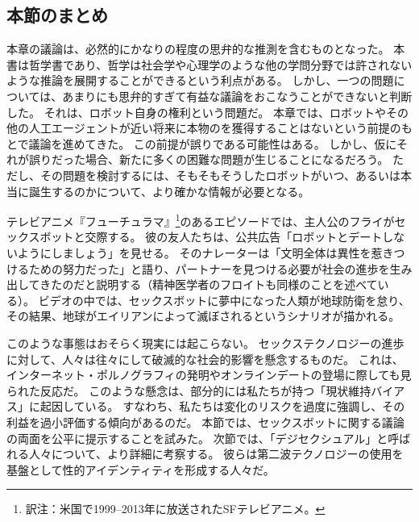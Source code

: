 \documentclass[paper=a4,book,openany]{jlreq}
\begin{document}
\subsection{本節のまとめ}

本章の議論は、必然的にかなりの程度の思弁的な推測を含むものとなった。
本書は哲学書であり、哲学は社会学や心理学のような他の学問分野では許されないような推論を展開することができるという利点がある。
しかし、一つの問題については、あまりにも思弁的すぎて有益な議論をおこなうことができないと判断した。
それは、ロボット自身の権利という問題だ。
本章では、ロボットやその他の人工エージェントが近い将来に本物のを獲得することはないという前提のもとで議論を進めてきた。
この前提が誤りである可能性はある。
しかし、仮にそれが誤りだった場合、新たに多くの困難な問題が生じることになるだろう。
ただし、その問題を検討するには、そもそもそうしたロボットがいつ、あるいは本当に誕生するのかについて、より確かな情報が必要となる。

テレビアニメ『フューチュラマ』\footnote{訳注：米国で1999--2013年に放送されたSFテレビアニメ。}のあるエピソードでは、主人公のフライがセックスボットと交際する。
彼の友人たちは、公共広告「ロボットとデートしないようにしましょう」を見せる。
そのナレーターは「文明全体は異性を惹きつけるための努力だった」と語り、パートナーを見つける必要が社会の進歩を生み出してきたのだと説明する（精神医学者のフロイトも同様のことを述べている）。
ビデオの中では、セックスボットに夢中になった人類が地球防衛を怠り、その結果、地球がエイリアンによって滅ぼされるというシナリオが描かれる。

このような事態はおそらく現実には起こらない。
セックステクノロジーの進歩に対して、人々は往々にして破滅的な社会的影響を懸念するものだ。
これは、インターネット・ポルノグラフィの発明やオンラインデートの登場に際しても見られた反応だ。
このような懸念は、部分的には私たちが持つ「現状維持バイアス」に起因している。
すなわち、私たちは変化のリスクを過度に強調し、その利益を過小評価する傾向があるのだ。
本節では、セックスボットに関する議論の両面を公平に提示することを試みた。
次節では、「デジセクシュアル」と呼ばれる人々について、より詳細に考察する。
彼らは第二波テクノロジーの使用を基盤として性的アイデンティティを形成する人々だ。
\end{document}
